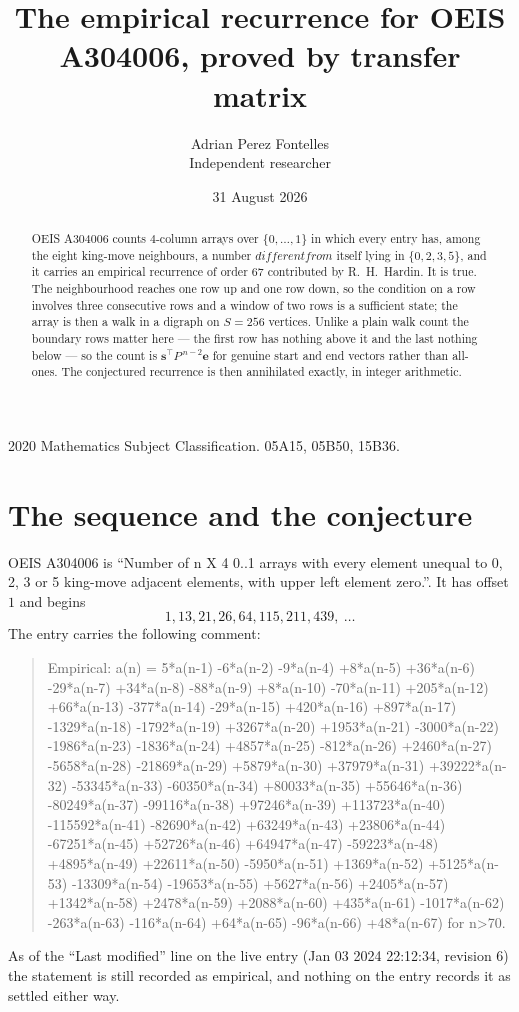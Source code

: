 \documentclass[11pt,a4paper]{article}
\title{The empirical recurrence for OEIS A304006, proved by transfer matrix}
\author{Adrian Perez Fontelles\\ \small Independent researcher}
\date{31 August 2026}
\theoremstyle{plain}
\theoremstyle{definition}
\begin{document}
\maketitle

\begin{abstract}
OEIS A304006 counts $4$-column arrays over $\{0,\dots,1\}$ in which every entry has,
among the eight king-move neighbours, a number $different from$ itself lying in $\{0,2,3,5\}$, and it carries an empirical
recurrence of order $67$ contributed by R.~H.~Hardin. It is true. The neighbourhood
reaches one row up and one row down, so the condition on a row involves three consecutive
rows and a window of two rows is a sufficient state; the array is then a walk in a digraph
on $S=256$ vertices. Unlike a plain walk count the boundary rows matter here --- the first
row has nothing above it and the last nothing below --- so the count is
$\mathbf{s}^{\!\top}P^{\,n-2}\mathbf{e}$ for genuine start and end vectors rather than
all-ones. The conjectured recurrence is then annihilated exactly, in integer arithmetic.
\end{abstract}

\noindent\small 2020 Mathematics Subject Classification. 05A15, 05B50, 15B36.\normalsize

\section{The sequence and the conjecture}

OEIS A304006 is ``Number of n X 4 0..1 arrays with every element unequal to 0, 2, 3 or 5 king-move adjacent elements, with upper left element zero.''. It has offset
$1$ and begins
\[
1, 13, 21, 26, 64, 115, 211, 439,\ \dots
\]
The entry carries the following comment:
\begin{quote}\small
Empirical: a(n) = 5*a(n-1) -6*a(n-2) -9*a(n-4) +8*a(n-5) +36*a(n-6) -29*a(n-7) +34*a(n-8) -88*a(n-9) +8*a(n-10) -70*a(n-11) +205*a(n-12) +66*a(n-13) -377*a(n-14) -29*a(n-15) +420*a(n-16) +897*a(n-17) -1329*a(n-18) -1792*a(n-19) +3267*a(n-20) +1953*a(n-21) -3000*a(n-22) -1986*a(n-23) -1836*a(n-24) +4857*a(n-25) -812*a(n-26) +2460*a(n-27) -5658*a(n-28) -21869*a(n-29) +5879*a(n-30) +37979*a(n-31) +39222*a(n-32) -53345*a(n-33) -60350*a(n-34) +80033*a(n-35) +55646*a(n-36) -80249*a(n-37) -99116*a(n-38) +97246*a(n-39) +113723*a(n-40) -115592*a(n-41) -82690*a(n-42) +63249*a(n-43) +23806*a(n-44) -67251*a(n-45) +52726*a(n-46) +64947*a(n-47) -59223*a(n-48) +4895*a(n-49) +22611*a(n-50) -5950*a(n-51) +1369*a(n-52) +5125*a(n-53) -13309*a(n-54) -19653*a(n-55) +5627*a(n-56) +2405*a(n-57) +1342*a(n-58) +2478*a(n-59) +2088*a(n-60) +435*a(n-61) -1017*a(n-62) -263*a(n-63) -116*a(n-64) +64*a(n-65) -96*a(n-66) +48*a(n-67) for n>70.
\end{quote}
As of the ``Last modified'' line on the live entry (Jan 03 2024 22:12:34, revision
6) the statement is still recorded as empirical, and nothing on the entry
records it as settled either way.
\end{document}
